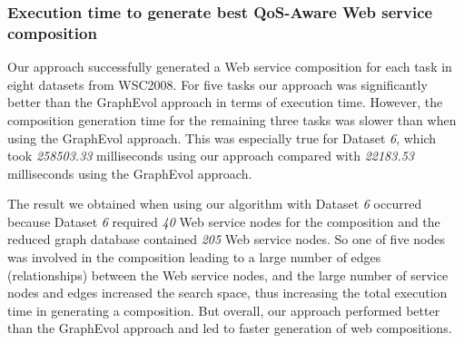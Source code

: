 \subsubsection{Execution time to generate best QoS-Aware Web service composition} 
Our approach successfully generated a Web service composition for each task in eight datasets from WSC2008. For five tasks our approach was significantly better than the GraphEvol approach in terms of execution time. However, the composition generation time for the remaining three tasks was slower than when using the GraphEvol approach. This was especially true for Dataset \emph{6}, which took \emph{258503.33} milliseconds using our approach compared with \emph{22183.53} milliseconds using the GraphEvol approach.\par

The result we obtained when using our algorithm with Dataset \emph{6} occurred because Dataset \emph{6} required \emph{40} Web service nodes for the composition and the reduced graph database contained \emph{205} Web service nodes. So one of five nodes was involved in the composition leading to a large number of edges (relationships) between the Web service nodes, and the large number of service nodes and edges increased the search space, thus increasing the total execution time in generating a composition. But overall, our approach performed better than the GraphEvol approach and led to faster generation of web compositions.\par



